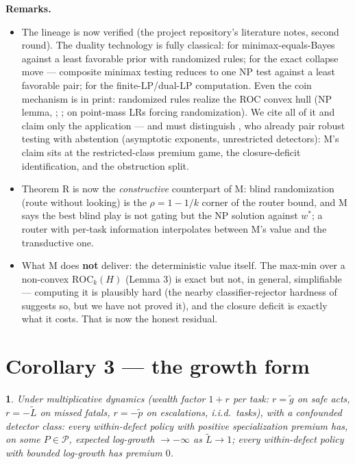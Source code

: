 \documentclass[11pt]{article}
\theoremstyle{plain}
\newtheorem*{namedthminner}{\namedthmname}
\newenvironment{nthm}[1]{\def\namedthmname{#1}\begin{namedthminner}}{\end{namedthminner}}
\theoremstyle{definition}
\begin{document}
\textbf{Remarks.}
\begin{itemize}
\item The lineage is now verified (the project repository's literature notes,
  second round). The duality
  technology is fully classical: \citet{wald1945,wald1950} for minimax-equals-Bayes
  against a least favorable prior with randomized rules; \textbf{\citet{huberstrassen1973}}
  for the exact collapse move --- composite minimax testing reduces
  to one NP test against a least favorable pair; \citet{fillatre2017} for the
  finite-LP/dual-LP computation. Even the coin mechanism is in print:
  randomized rules realize the ROC convex hull (NP lemma, \citealt[Thm 3.2.1]{lehmannromano2005};
  \citealt{provost2001}; \citealt[\S V-D]{fauss2021} on point-mass LRs
  forcing randomization). We cite all of it and claim only the application ---
  and must distinguish \citet{managoli2025},
  who already pair robust testing with abstention (asymptotic exponents,
  unrestricted detectors): M's claim sits at the restricted-class premium
  game, the closure-deficit identification, and the obstruction split.
\item Theorem R is now the \emph{constructive} counterpart of M: blind randomization
  (route without looking) is the $\rho = 1 - 1/k$ corner of the router bound,
  and M says the best blind play is not gating but the NP solution against
  $w^*$; a router with per-task information interpolates between M's value
  and the transductive one.
\item What M does \textbf{not} deliver: the deterministic value itself. The max-min
  over a non-convex $\mathrm{ROC}_k(H)$ (Lemma 3) is exact but not, in
  general, simplifiable --- computing it is plausibly hard (the nearby
  classifier-rejector hardness of \citealt{mozannar2023} suggests so, but we
  have not proved it), and the closure deficit is exactly what it costs. That
  is now the honest residual.
\end{itemize}

\section{Corollary 3 --- the growth form}\label{app:growth}

\begin{nthm}{Corollary 3}
Under multiplicative dynamics (wealth factor $1+r$ per task:
$r = \tilde g$ on safe acts, $r = -\tilde L$ on missed fatals, $r = -\tilde p$
on escalations, i.i.d.\ tasks), with a confounded detector class: every
within-defect policy with positive specialization premium has, on some
$P \in \mathcal{P}$, expected log-growth $\to -\infty$ as $\tilde L \to 1$;
every within-defect policy with bounded log-growth has premium $0$.
\end{nthm}
\end{document}
